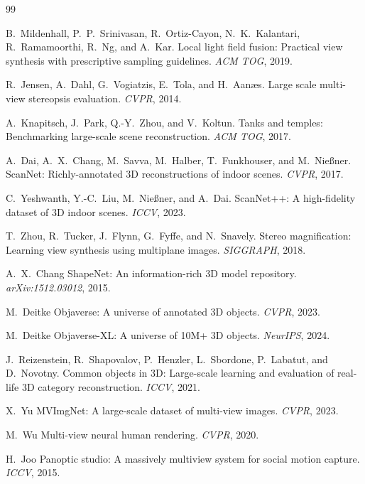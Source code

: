 \begin{thebibliography}{99}

B.~Mildenhall, P.~P.~Srinivasan, R.~Ortiz-Cayon, N.~K.~Kalantari,
R.~Ramamoorthi, R.~Ng, and A.~Kar.
Local light field fusion: Practical view synthesis with prescriptive sampling
guidelines.
\emph{ACM TOG}, 2019.


R.~Jensen, A.~Dahl, G.~Vogiatzis, E.~Tola, and H.~Aan{\ae}s.
Large scale multi-view stereopsis evaluation.
\emph{CVPR}, 2014.


A.~Knapitsch, J.~Park, Q.-Y.~Zhou, and V.~Koltun.
Tanks and temples: Benchmarking large-scale scene reconstruction.
\emph{ACM TOG}, 2017.


A.~Dai, A.~X.~Chang, M.~Savva, M.~Halber, T.~Funkhouser, and M.~Nie{\ss}ner.
ScanNet: Richly-annotated 3D reconstructions of indoor scenes.
\emph{CVPR}, 2017.


C.~Yeshwanth, Y.-C.~Liu, M.~Nie{\ss}ner, and A.~Dai.
ScanNet++: A high-fidelity dataset of 3D indoor scenes.
\emph{ICCV}, 2023.


T.~Zhou, R.~Tucker, J.~Flynn, G.~Fyffe, and N.~Snavely.
Stereo magnification: Learning view synthesis using multiplane images.
\emph{SIGGRAPH}, 2018.


A.~X.~Chang \etal
ShapeNet: An information-rich 3D model repository.
\emph{arXiv:1512.03012}, 2015.


M.~Deitke \etal
Objaverse: A universe of annotated 3D objects.
\emph{CVPR}, 2023.


M.~Deitke \etal
Objaverse-XL: A universe of 10M+ 3D objects.
\emph{NeurIPS}, 2024.


J.~Reizenstein, R.~Shapovalov, P.~Henzler, L.~Sbordone, P.~Labatut, and
D.~Novotny.
Common objects in 3D: Large-scale learning and evaluation of real-life 3D
category reconstruction.
\emph{ICCV}, 2021.


X.~Yu \etal
MVImgNet: A large-scale dataset of multi-view images.
\emph{CVPR}, 2023.


M.~Wu \etal
Multi-view neural human rendering.
\emph{CVPR}, 2020.


H.~Joo \etal
Panoptic studio: A massively multiview system for social motion capture.
\emph{ICCV}, 2015.



\end{thebibliography}
